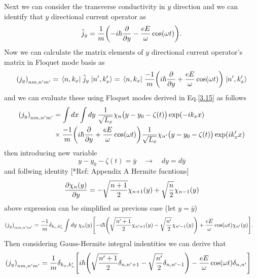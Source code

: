 \noindent
Next we can consider the transverse conductivity in $y$ direction and we can identify that $y$ directional current operator as
\begin{equation} \label{6.17}
  \hat{j}_y = \frac{1}{m} \qty(-i\hbar\pdv{y} - \frac{eE}{\omega}\cos(\omega t)).
\end{equation}
Now we can calculate the matrix elements of $y$ directional current operator's matrix in Floquet mode basis as
\begin{equation} \label{6.18}
  \qty({j}_y)_{nm,n'm'} = \mel{n,k_x}{\;\hat{j}_y\;}{n',k'_x} =
  \mel{n,k_x}{\;\frac{-1}{m} \qty(i\hbar\pdv{y} + \frac{eE}{\omega}\cos(\omega t))\;}{n',k'_x}
\end{equation}
and we can evaluate these using Floquet modes derived in Eq.\eqref{3.15} as follows
\begin{equation} \label{6.19}
  \begin{aligned}
    \qty({j}_y)_{nm,n'm'} & =
    \int dx \int dy \;
    \frac{1}{\sqrt{L_x}} \chi_{n}\big(y - y_0 - \zeta(t)\big)
    \exp(-ik_x x) \\
    & \times
    \frac{-1}{m} \qty(i\hbar\pdv{y} + \frac{eE}{\omega}\cos(\omega t))
    \frac{1}{\sqrt{L_x}} \chi_{n'}\big(y - y_0 - \zeta(t)\big)
    \exp(i k'_x x)
  \end{aligned}
\end{equation}
then introducing new variable
\begin{equation} \label{6.20}
  y - y_0 - \zeta(t) = \bar{y} \quad \longrightarrow \quad dy = d{\bar{y}}
\end{equation}
and follwing identity [*Ref: Appendix A Hermite fucntions]
\begin{equation} \label{6.21}
  \pdv{\chi_n(y)}{y} = -\sqrt{\frac{n+1}{2}} \chi_{n+1}(y) +
  \sqrt{\frac{n}{2}} \chi_{n-1}(y)
\end{equation}
above expression can be simplified as previous case (let $y=\bar{y}$)
\begin{equation} \label{6.22}
  \begin{aligned}
    \qty({j}_y)_{nm,n'm'} & =
    \frac{-1}{{m}}
    \delta_{k_x,k'_x}
    \int dy \;
     \chi_{n}(y)
    \qty[-i\hbar \qty(
    \sqrt{\frac{n'+1}{2}} \chi_{n'+1}(y) - \sqrt{\frac{n'}{2}} \chi_{n'-1}(y)
    ) + \frac{eE}{\omega}\cos(\omega t)
    \chi_{n'}(y)].
  \end{aligned}
\end{equation}
Then considering Gauss-Hermite integral indentities we can derive that
\begin{equation} \label{6.23}
  \begin{aligned}
    \qty({j}_y)_{nm,n'm'} & =
    \frac{1}{{m}}
    \delta_{k_x,k'_x}
    \qty[i\hbar \qty(
    \sqrt{\frac{n'+1}{2}} \delta_{n,n'+1}
    - \sqrt{\frac{n'}{2}} \delta_{n,n'-1}
    ) - \frac{eE}{\omega}\cos(\omega t) \delta_{n,n'}]
  \end{aligned}
\end{equation}
